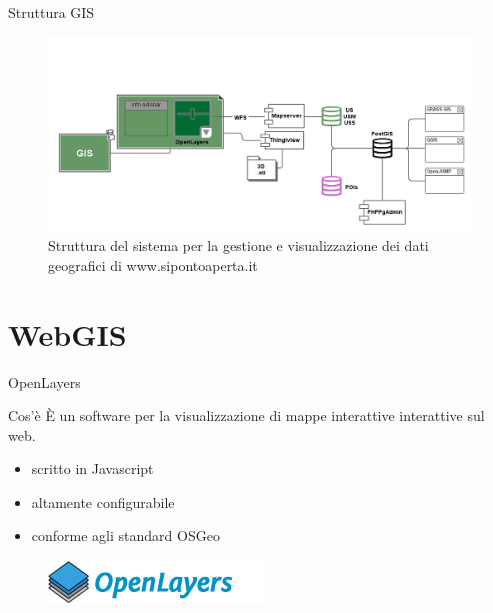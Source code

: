 \documentclass{beamer}
\begin{document}
		\begin{frame}{Struttura GIS}
			\begin{figure}[]
				\begin{center}
					\includegraphics[width=1\linewidth,trim=20 0 0 50,clip=true]{gis_scheme}
				\end{center}
				\caption{Struttura del sistema per la gestione e visualizzazione dei dati geografici di www.sipontoaperta.it}
				\label{fig:gis}
			\end{figure}
		\end{frame}

	\section{WebGIS}

		\begin{frame}{OpenLayers}
			\begin{block}{Cos'è}
				È un software per la visualizzazione di mappe interattive interattive sul web.
			\end{block}
			\begin{multicols}{2}[][]
				\begin{itemize}
					\item scritto in Javascript
					\item altamente configurabile
					\item conforme agli standard OSGeo
				\end{itemize}
				\columnbreak
				\begin{figure}[]
					\begin{center}
					\includegraphics[width=1\linewidth]{sw_logos/ol}
					\end{center}
					\label{fig:ol}
				\end{figure}
			\end{multicols}
			
		\end{frame}
\end{document}
